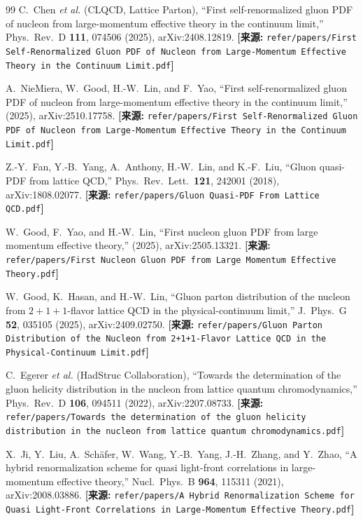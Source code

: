 \documentclass[12pt,a4paper]{ctexart}
\theoremstyle{definition}
\begin{document}
\begin{thebibliography}{99}
C.~Chen \textit{et al.} (CLQCD, Lattice Parton),
``First self-renormalized gluon PDF of nucleon from large-momentum effective theory in the continuum limit,''
Phys.\ Rev.\ D \textbf{111}, 074506 (2025), arXiv:2408.12819.
\quad\textbf{[来源:} \texttt{refer/papers/First Self-Renormalized Gluon PDF of Nucleon from Large-Momentum Effective Theory in the Continuum Limit.pdf}\textbf{]}

A.~NieMiera, W.~Good, H.-W.~Lin, and F.~Yao,
``First self-renormalized gluon PDF of nucleon from large-momentum effective theory in the continuum limit,''
(2025), arXiv:2510.17758.
\quad\textbf{[来源:} \texttt{refer/papers/First Self-Renormalized Gluon PDF of Nucleon from Large-Momentum Effective Theory in the Continuum Limit.pdf}\textbf{]}

Z.-Y.~Fan, Y.-B.~Yang, A.~Anthony, H.-W.~Lin, and K.-F.~Liu,
``Gluon quasi-PDF from lattice QCD,''
Phys.\ Rev.\ Lett.\ \textbf{121}, 242001 (2018), arXiv:1808.02077.
\quad\textbf{[来源:} \texttt{refer/papers/Gluon Quasi-PDF From Lattice QCD.pdf}\textbf{]}

W.~Good, F.~Yao, and H.-W.~Lin,
``First nucleon gluon PDF from large momentum effective theory,''
(2025), arXiv:2505.13321.
\quad\textbf{[来源:} \texttt{refer/papers/First Nucleon Gluon PDF from Large Momentum Effective Theory.pdf}\textbf{]}

W.~Good, K.~Hasan, and H.-W.~Lin,
``Gluon parton distribution of the nucleon from $2+1+1$-flavor lattice QCD in the physical-continuum limit,''
J.\ Phys.\ G \textbf{52}, 035105 (2025), arXiv:2409.02750.
\quad\textbf{[来源:} \texttt{refer/papers/Gluon Parton Distribution of the Nucleon from 2+1+1-Flavor Lattice QCD in the Physical-Continuum Limit.pdf}\textbf{]}

C.~Egerer \textit{et al.} (HadStruc Collaboration),
``Towards the determination of the gluon helicity distribution in the nucleon from lattice quantum chromodynamics,''
Phys.\ Rev.\ D \textbf{106}, 094511 (2022), arXiv:2207.08733.
\quad\textbf{[来源:} \texttt{refer/papers/Towards the determination of the gluon helicity distribution in the nucleon from lattice quantum chromodynamics.pdf}\textbf{]}

X.~Ji, Y.~Liu, A.~Sch\"afer, W.~Wang, Y.-B.~Yang, J.-H.~Zhang, and Y.~Zhao,
``A hybrid renormalization scheme for quasi light-front correlations in large-momentum effective theory,''
Nucl.\ Phys.\ B \textbf{964}, 115311 (2021), arXiv:2008.03886.
\quad\textbf{[来源:} \texttt{refer/papers/A Hybrid Renormalization Scheme for Quasi Light-Front Correlations in Large-Momentum Effective Theory.pdf}\textbf{]}


\end{thebibliography}
\end{document}
